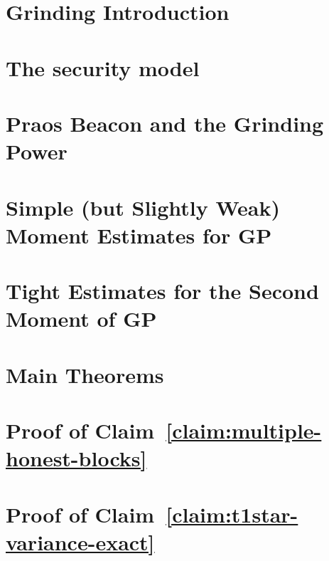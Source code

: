 \chapter{Grinding Introduction }\label{ch:grinding-intro}


\chapter{The security model}\label{sec:model-grinding}


% 

\chapter{Praos Beacon and the Grinding Power}\label{sec:praos}



\chapter{Simple (but Slightly Weak) Moment Estimates for GP}\label{app:grinding-praos}



\chapter{Tight Estimates for the Second Moment of GP}\label{sec:praos-second-moment}


\chapter{Main Theorems}\label{sec:praos-main-theorems}


\chapter{Proof of Claim~\ref{claim:multiple-honest-blocks}}\label{sec:praos-claim-multiple-honest-blocks}



\chapter{Proof of Claim~\ref{claim:t1star-variance-exact}}\label{sec:praos-claim-t1star-variance-exact}



